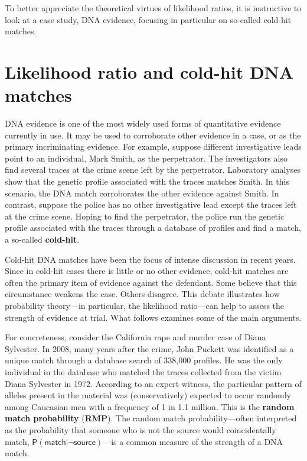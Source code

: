 \documentclass[10pt,dvipsnames,enabledeprecatedfontcommands]{scrartcl}
\newcommand{\pr}[1]{\mathsf{P}(#1)}
\begin{document}
To better appreciate the theoretical virtues of likelihood ratios, it is
instructive to look at a case study, DNA evidence, focusing in
particular on so-called cold-hit matches.

\section{\texorpdfstring{Likelihood ratio and cold-hit DNA matches
\label{subsec:cold-hit}}{Likelihood ratio and cold-hit DNA matches }}\label{likelihood-ratio-and-cold-hit-dna-matches}

DNA evidence is one of the most widely used forms of quantitative
evidence currently in use. It may be used to corroborate other evidence
in a case, or as the primary incriminating evidence. For example,
suppose different investigative leads point to an individual, Mark
Smith, as the perpetrator. The investigators also find several traces at
the crime scene left by the perpetrator. Laboratory analyses show that
the genetic profile associated with the traces matches Smith. In this
scenario, the DNA match corroborates the other evidence against Smith.
In contrast, suppose the police has no other investigative lead except
the traces left at the crime scene. Hoping to find the perpetrator, the
police run the genetic profile associated with the traces through a
database of profiles and find a match, a so-called \textbf{cold-hit}.

Cold-hit DNA matches have been the focus of intense discussion in recent
years. Since in cold-hit cases there is little or no other evidence,
cold-hit matches are often the primary item of evidence against the
defendant. Some believe that this circumstance weakens the case. Others
disagree. This debate illustrates how probability theory---in
particular, the likelihood ratio---can help to assess the strength of
evidence at trial. What follows examines some of the main arguments.

For concreteness, consider the California rape and murder case of Diana
Sylvester. In 2008, many years after the crime, John Puckett was
identified as a unique match through a database search of 338,000
profiles. He was the only individual in the database who matched the
traces collected from the victim Diana Sylvester in 1972. According to
an expert witness, the particular pattern of alleles present in the
material was (conservatively) expected to occur randomly among Caucasian
men with a frequency of 1 in 1.1 million. This is the
\textbf{random match probability} (\textbf{RMP}). The random match
probability---often interpreted as the probability that someone who is
not the source would coincidentally match,
\(\pr{\textsf{match} \vert \neg \textsf{source}}\)---is a common measure
of the strength of a DNA match.
\end{document}
